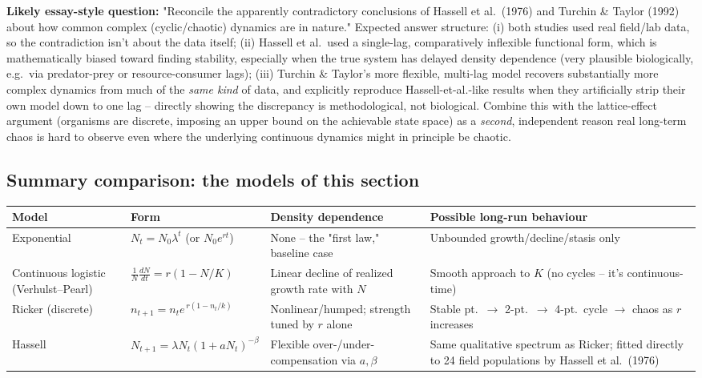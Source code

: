 \documentclass[11pt,a4paper]{article}
\begin{document}
\begin{exambox}
\textbf{Likely essay-style question:} "Reconcile the apparently contradictory conclusions of Hassell et al.\ (1976) and Turchin \& Taylor (1992) about how common complex (cyclic/chaotic) dynamics are in nature." Expected answer structure: (i) both studies used real field/lab data, so the contradiction isn't about the data itself; (ii) Hassell et al.\ used a single-lag, comparatively inflexible functional form, which is mathematically biased toward finding stability, especially when the true system has delayed density dependence (very plausible biologically, e.g.\ via predator-prey or resource-consumer lags); (iii) Turchin \& Taylor's more flexible, multi-lag model recovers substantially more complex dynamics from much of the \emph{same kind} of data, and explicitly reproduce Hassell-et-al.-like results when they artificially strip their own model down to one lag -- directly showing the discrepancy is methodological, not biological. Combine this with the lattice-effect argument (organisms are discrete, imposing an upper bound on the achievable state space) as a \emph{second}, independent reason real long-term chaos is hard to observe even where the underlying continuous dynamics might in principle be chaotic.
\end{exambox}

\subsection{Summary comparison: the models of this section}
\begin{center}
\begin{tabularx}{\textwidth}{@{}l X X X@{}}
\toprule
\textbf{Model} & \textbf{Form} & \textbf{Density dependence} & \textbf{Possible long-run behaviour} \\
\midrule
Exponential & $N_t=N_0\lambda^t$ (or $N_0e^{rt}$) & None -- the "first law," baseline case & Unbounded growth/decline/stasis only \\
Continuous logistic (Verhulst--Pearl) & $\frac{1}{N}\frac{dN}{dt}=r(1-N/K)$ & Linear decline of realized growth rate with $N$ & Smooth approach to $K$ (no cycles -- it's continuous-time) \\
Ricker (discrete) & $n_{t+1}=n_t e^{\,r(1-n_t/k)}$ & Nonlinear/humped; strength tuned by $r$ alone & Stable pt.\ $\to$ 2-pt.\ $\to$ 4-pt.\ cycle $\to$ chaos as $r$ increases \\
Hassell & $N_{t+1}=\lambda N_t(1+aN_t)^{-\beta}$ & Flexible over-/under-compensation via $a,\beta$ & Same qualitative spectrum as Ricker; fitted directly to 24 field populations by Hassell et al.\ (1976) \\
\bottomrule
\end{tabularx}
\end{center}
\end{document}
